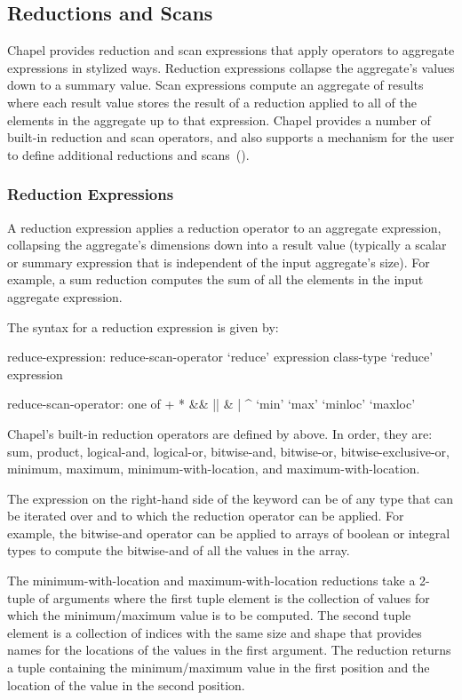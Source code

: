 \subsection{Reductions and Scans}
\label{Reductions_and_Scans}

Chapel provides reduction and scan expressions that apply operators to
aggregate expressions in stylized ways.  Reduction expressions
collapse the aggregate's values down to a summary value.  Scan
expressions compute an aggregate of results where each result value
stores the result of a reduction applied to all of the elements in the
aggregate up to that expression.  Chapel provides a number of built-in
reduction and scan operators, and also supports a mechanism for the
user to define additional reductions and
scans~().

\subsubsection{Reduction Expressions}
\label{reduce}

A reduction expression applies a reduction operator to an aggregate
expression, collapsing the aggregate's dimensions down into a result
value (typically a scalar or summary expression that is independent of
the input aggregate's size).  For example, a sum reduction computes
the sum of all the elements in the input aggregate expression.

The syntax for a reduction expression is given by:
\begin{syntax}
reduce-expression:
  reduce-scan-operator `reduce' expression
  class-type `reduce' expression

reduce-scan-operator: one of
  + * && || & | ^ `min' `max' `minloc' `maxloc'
\end{syntax}

Chapel's built-in reduction operators are defined
by  above.  In order, they are: sum,
product, logical-and, logical-or, bitwise-and, bitwise-or,
bitwise-exclusive-or, minimum, maximum, minimum-with-location, and
maximum-with-location.

The expression on the right-hand side of the  keyword
can be of any type that can be iterated over and to which the
reduction operator can be applied.  For example, the bitwise-and
operator can be applied to arrays of boolean or integral types to
compute the bitwise-and of all the values in the array.

The minimum-with-location and maximum-with-location reductions take a
2-tuple of arguments where the first tuple element is the collection
of values for which the minimum/maximum value is to be computed.  The
second tuple element is a collection of indices with the same size and
shape that provides names for the locations of the values in the first
argument.  The reduction returns a tuple containing the
minimum/maximum value in the first position and the location of the
value in the second position.

